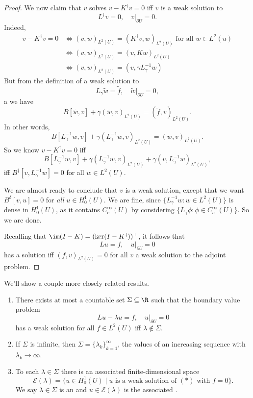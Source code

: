 \documentclass[a4paper]{article}
\begin{document}
\begin{proof}
  We now claim that $v$ solves $v - K^\dagger v = 0$ iff $v$ is a weak solution to
  \[
    L^\dagger v = 0,\quad v|_{\partial U} = 0.
  \]
  Indeed,
  \begin{align*}
    v - K^\dagger v = 0 &\Longleftrightarrow (v, w)_{L^2(U)} = (K^\dagger v, w)_{L^2(U)}\text{ for all }w \in L^2(u)\\
    &\Longleftrightarrow (v, w)_{L^2(U)} = (v, Kw)_{L^2(U)}\\
    &\Longleftrightarrow (v, w)_{L^2(U)} = (v, \gamma L_\gamma^{-1}w)
  \end{align*}
  But from the definition of a weak solution to
  \[
    L_\gamma \tilde{w} = \tilde{f},\quad \tilde{w}|_{\partial U} = 0,
  \]a
  we have
  \[
    B[\tilde{w}, v] + \gamma(\tilde{w}, v)_{L^2(U)} = (\tilde{f}, v)_{L^2(U)}.
  \]
  In other words,
  \[
    B[L_\gamma^{-1}w, v] + \gamma (L_\gamma^{-1}w, v)_{L^2(U)} = (w, v)_{L^2(U)}.
  \]
  So we know $v - K^\dagger v = 0$ iff
  \[
    B[L_\gamma^{-1}w, v] + \gamma (L_\gamma^{-1} w, v)_{L^2(U)} + \gamma (v, L_{\gamma}^{-1} w)_{L^2(U)},
  \]
  iff $B^\dagger[v, L_\gamma^{-1}w] = 0$ for all $w \in L^2(U)$.

  We are almost ready to conclude that $v$ is a weak solution, except that we want $B^\delta[v, u] = 0$ for \emph{all} $u \in H_0^1(U)$. We are fine, since $\{L_\gamma^{-1}w : w \in L^2(U)\}$ is dense in $H_0^1(U)$, as it contains $C_c^\infty(U)$ by considering $\{L_\gamma \phi: \phi \in C_c^\infty(U)\}$. So we are done.

  Recalling that $\im (I - K) = (\ker (I - K^\dagger))^\perp$, it follows that
  \[
    Lu = f,\quad u|_{\partial U} = 0
  \]
  has a solution iff $(f, v)_{L^2(U)} = 0$ for all $v$ a weak solution to the adjoint problem.
\end{proof}

We'll show a couple more closely related results.

\begin{thm}[Spectrum of $L$]\leavevmode
  \begin{enumerate}
    \item There exists at most a countable set $\Sigma \subseteq \R$ such that the boundary value problem
      \[
        Lu - \lambda u = f,\quad u|_{\partial U} = 0\tag{$*$}
      \]
      has a weak solution for all $f \in L^2(U)$ iff $\lambda \not \in \Sigma$.
    \item If $\Sigma$ is infinite, then $\Sigma = \{\lambda_k\}_{k = 1}^\infty$, the values of an increasing sequence with $\lambda_k \to \infty$.
    \item To each $\lambda \in \Sigma$ there is an associated finite-dimensional space
      \[
        \mathcal{E}(\lambda) = \{u \in H_0^1(U) \mid u\text{ is a weak solution of }(*)\text{ with $f = 0$}\}.
      \]
      We say $\lambda \in \Sigma$ is an  and $u \in \mathcal{E}(\lambda)$ is the associated .
  \end{enumerate}
\end{thm}
\end{document}

